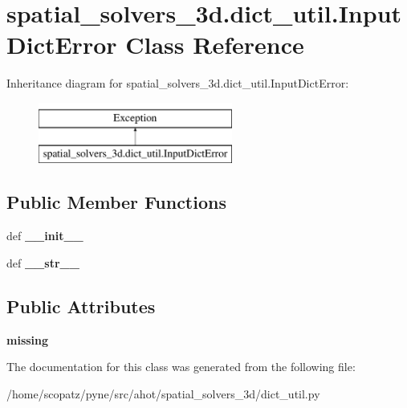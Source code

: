 \hypertarget{classspatial__solvers__3d_1_1dict__util_1_1_input_dict_error}{\section{spatial\-\_\-solvers\-\_\-3d.\-dict\-\_\-util.\-Input\-Dict\-Error Class Reference}
\label{classspatial__solvers__3d_1_1dict__util_1_1_input_dict_error}
}
Inheritance diagram for spatial\-\_\-solvers\-\_\-3d.\-dict\-\_\-util.\-Input\-Dict\-Error\-:\begin{figure}[H]
\begin{center}
\leavevmode
\includegraphics[height=2.000000cm]{classspatial__solvers__3d_1_1dict__util_1_1_input_dict_error}
\end{center}
\end{figure}
\subsection*{Public Member Functions}
\begin{DoxyCompactItemize}
\item 
\hypertarget{classspatial__solvers__3d_1_1dict__util_1_1_input_dict_error_a4966aa45d3b7fcb3d79a43b3d953d045}{def {\bfseries \-\_\-\-\_\-init\-\_\-\-\_\-}}\label{classspatial__solvers__3d_1_1dict__util_1_1_input_dict_error_a4966aa45d3b7fcb3d79a43b3d953d045}

\item 
\hypertarget{classspatial__solvers__3d_1_1dict__util_1_1_input_dict_error_af8d1148093139cb9f5ee4b154d3c0835}{def {\bfseries \-\_\-\-\_\-str\-\_\-\-\_\-}}\label{classspatial__solvers__3d_1_1dict__util_1_1_input_dict_error_af8d1148093139cb9f5ee4b154d3c0835}

\end{DoxyCompactItemize}
\subsection*{Public Attributes}
\begin{DoxyCompactItemize}
\item 
\hypertarget{classspatial__solvers__3d_1_1dict__util_1_1_input_dict_error_ac3622f01f73069150dcad765d8f9bd81}{{\bfseries missing}}\label{classspatial__solvers__3d_1_1dict__util_1_1_input_dict_error_ac3622f01f73069150dcad765d8f9bd81}

\end{DoxyCompactItemize}


The documentation for this class was generated from the following file\-:\begin{DoxyCompactItemize}
\item 
/home/scopatz/pyne/src/ahot/spatial\-\_\-solvers\-\_\-3d/dict\-\_\-util.\-py\end{DoxyCompactItemize}
